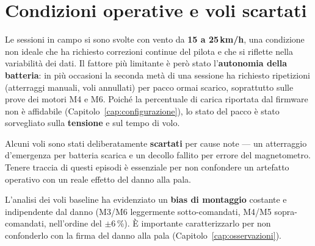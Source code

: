 \section{Condizioni operative e voli scartati}

Le sessioni in campo si sono svolte con vento da \textbf{15 a 25\,km/h}, una
condizione non ideale che ha richiesto correzioni continue del pilota e che si
riflette nella variabilit\`a dei dati. Il fattore pi\`u limitante \`e per\`o stato
l'\textbf{autonomia della batteria}: in pi\`u occasioni la seconda met\`a di una
sessione ha richiesto ripetizioni (atterraggi manuali, voli annullati) per pacco
ormai scarico, soprattutto sulle prove dei motori M4 e M6. Poich\'e la percentuale
di carica riportata dal firmware non \`e affidabile (Capitolo~\ref{cap:configurazione}),
lo stato del pacco \`e stato sorvegliato sulla \textbf{tensione} e sul tempo di
volo.

Alcuni voli sono stati deliberatamente \textbf{scartati} per cause note --- un
atterraggio d'emergenza per batteria scarica e un decollo fallito per errore del
magnetometro. Tenere traccia di questi episodi \`e essenziale per non confondere un
artefatto operativo con un reale effetto del danno alla pala.

\begin{notabox}
L'analisi dei voli baseline ha evidenziato un \textbf{bias di montaggio} costante
e indipendente dal danno (M3/M6 leggermente sotto-comandati, M4/M5
sopra-comandati, nell'ordine del $\pm$6\,\%). \`E importante caratterizzarlo per
non confonderlo con la firma del danno alla pala
(Capitolo~\ref{cap:osservazioni}).
\end{notabox}
